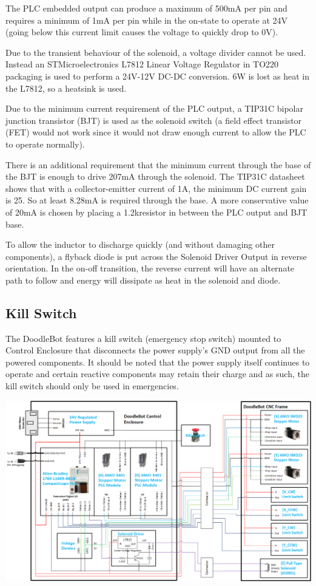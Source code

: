 		The PLC embedded output can produce a maximum of 500mA per pin and requires a minimum of 1mA per pin while in the on-state to operate at 24V (going below this current limit causes the voltage to quickly drop to 0V).
		
		Due to the transient behaviour of the solenoid, a voltage divider cannot be used. Instead an STMicroelectronics L7812 Linear Voltage Regulator in TO220 packaging is used to perform a 24V-12V DC-DC conversion. 6W is lost as heat in the L7812, so a heatsink is used.
		
		Due to the minimum current requirement of the PLC output, a TIP31C bipolar junction transistor (BJT) is used as the solenoid switch (a field effect transistor (FET) would not work since it would not draw enough current to allow the PLC to operate normally).
		
		There is an additional requirement that the minimum current through the base of the BJT is enough to drive 207mA through the solenoid. The TIP31C datasheet shows that with a collector-emitter current of 1A, the minimum DC current gain is 25. So at least 8.28mA is required through the base. A more conservative value of 20mA is chosen by placing a 1.2k\Omega resistor in between the PLC output and BJT base.
		
		To allow the inductor to discharge quickly (and without damaging other components), a flyback diode is put across the Solenoid Driver Output in reverse orientation. In the on-off transition, the reverse current will have an alternate path to follow and energy will dissipate as heat in the solenoid and diode.
		
		
	\subsection{Kill Switch}
		The DoodleBot features a kill switch (emergency stop switch) mounted to Control Enclosure that disconnects the power supply's GND output from all the powered components. It should be noted that the power supply itself continues to operate and certain reactive components may retain their charge and as such, the kill switch should only be used in emergencies.


\begin{landscape}
		\vspace*{\fill}
		\includegraphics[width=\hsize]{figures/cncMachine/wiring}
		\label{fig:WiringDiagram}
		\vspace*{\fill}
\end{landscape}